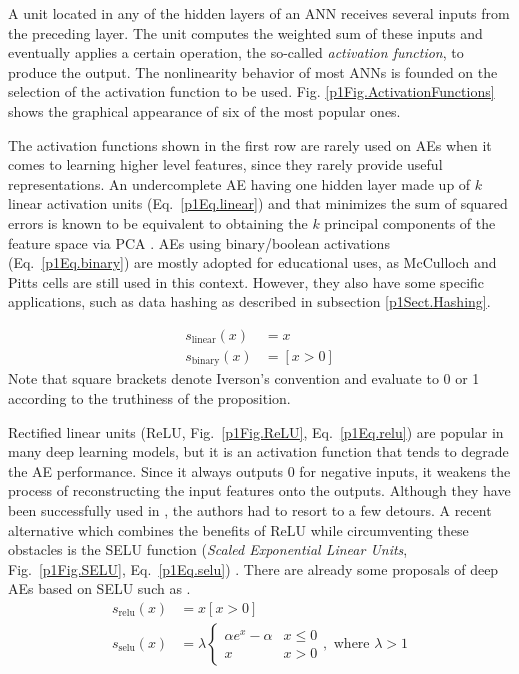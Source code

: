 A unit located in any of the hidden layers of an ANN receives several inputs from the preceding layer. The unit computes the weighted sum of these inputs and eventually applies a certain operation, the so-called \textit{activation function}, to produce the output. The nonlinearity behavior of most ANNs is founded on the selection of the activation function to be used. Fig. \ref{p1Fig.ActivationFunctions} shows the graphical appearance of six of the most popular ones.


The activation functions shown in the first row are rarely used on AEs when it comes to learning higher level features, since they rarely provide useful representations. An undercomplete AE having one hidden layer made up of $k$ linear activation units (Eq.~\ref{p1Eq.linear}) and that minimizes the sum of squared errors is known to be equivalent to obtaining the $k$ principal components of the feature space via PCA . AEs using binary/boolean activations (Eq.~\ref{p1Eq.binary})  are mostly adopted for educational uses, as McCulloch and Pitts  cells are still used in this context. However, they also have some specific applications, such as data hashing as described in subsection \ref{p1Sect.Hashing}.

\begin{align}
  \label{p1Eq.linear} s_{\mathrm{linear}}(x) &= x \\
  \label{p1Eq.binary} s_{\mathrm{binary}}(x) &= [x > 0]
\end{align}
Note that square brackets denote Iverson's convention  and evaluate to 0 or 1 according to the truthiness of the proposition. 

Rectified linear units (ReLU, Fig.~\ref{p1Fig.ReLU}, Eq.~\ref{p1Eq.relu}) are popular in many deep learning models, but it is an activation function that tends to degrade the AE performance. Since it always outputs 0 for negative inputs, it weakens the process of reconstructing the input features onto the outputs. Although they have been successfully used in , the authors had to resort to a few detours. A recent alternative which combines the benefits of ReLU while circumventing these obstacles is the SELU function (\textit{Scaled Exponential Linear Units}, Fig.~\ref{p1Fig.SELU}, Eq.~\ref{p1Eq.selu}) . There are already some proposals of deep AEs based on SELU such as .
\begin{align}
  \label{p1Eq.relu} s_{\mathrm{relu}}(x) &= x[x > 0] \\
  \label{p1Eq.selu} s_{\mathrm{selu}}(x) &= \lambda \begin{cases} \alpha e^x-\alpha & x \leq 0 \\ x & x > 0 \end{cases},\text{ where }\lambda>1
\end{align}

